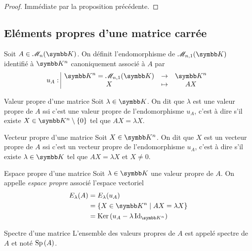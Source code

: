 \begin{proof}
    Immédiate par la proposition précédente. 
\end{proof}

\subsection{Eléments propres d'une matrice carrée }

\begin{definition}{}{}
    Soit $A \in \mathscr M_n(\K)$. On définit l'endomorphisme de $\mathscr M_{n, 1}(\K)$
    identifié à $\K^n$ canoniquement associé à $A$ par 
    $$\fonction{u_A}{\K^n = \mathscr M_{n, 1}(\K)}{\K^n}{X}{AX}$$
\end{definition}

\begin{definition}{Valeur propre d'une matrice}{}
    Soit $\lambda \in \K$. On dit que $\lambda$ est une valeur propre de $A$ ssi
    c'est une valeur propre de l'endomorphisme $u_A$, c'est à dire s'il existe 
    $X \in \K^n \setminus \{0\}$ tel que $AX = \lambda X$.
\end{definition}

\begin{definition}{Vecteur propre d'une matrice}{}
    Soit $X \in \K^n$. On dit que $X$ est un vecteur propre de $A$ ssi
    c'est un vecteur propre de l'endomorphisme $u_A$, c'est à dire s'il existe 
    $\lambda \in \K$ tel que $AX = \lambda X$ et $X \neq 0$.
\end{definition}

\begin{definition}{Espace propre d'une matrice}{}
    Soit $\lambda \in \K$ une valeur propre de $A$. On appelle \emph{espace propre} 
    associé l'espace vectoriel 
    \begin{align} E_\lambda(A) & = E_\lambda(u_A) \\
                        & = \{ X \in \K^n \mid AX = \lambda X \} \\
                        & = \Ker (u_A - \lambda \Id_{\K^n}) 
    \end{align}
\end{definition}

\begin{definition}{Spectre d'une matrice}{}
    L'ensemble des valeurs propres de $A$ est appelé spectre de $A$ 
    et noté $\operatorname{Sp} \,(A)$.
    
\end{definition}

